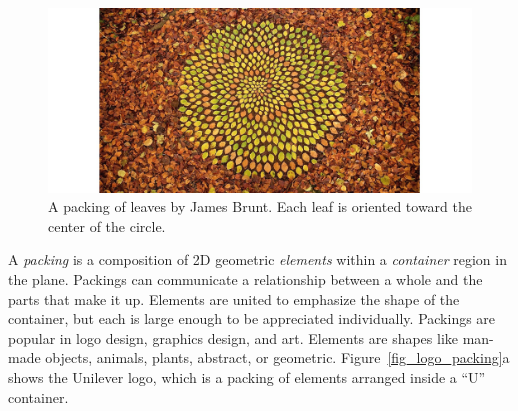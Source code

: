 \begin{figure}
\centering
\includegraphics[width=1.0\textwidth]{figures/intro/woodland.jpg} 
\caption[Packing in art]
{\label{fig_woodland} 
\newtext
{
A packing of leaves by James Brunt. Each leaf is oriented toward the center of the circle.
}
 }
\end{figure}





\newtext
{
A \textit{packing} is a composition of 2D geometric
\textit{elements} within a \textit{container} region in the plane.
Packings can communicate a relationship between a whole and the parts that make it up.
Elements are united to emphasize the shape of the container,
but each is large enough to be appreciated individually.
Packings are popular in logo design, graphics design, and art.
Elements are shapes like man-made objects, animals, plants, abstract, or geometric.
Figure~\ref{fig_logo_packing}a shows the Unilever logo,
which is a packing of elements arranged inside a ``U'' container.
}


